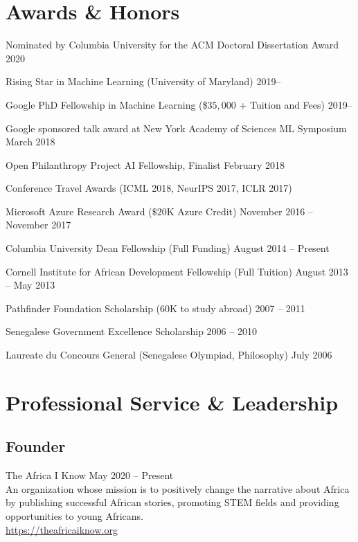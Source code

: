 \documentclass[letterpaper,200pt]{article}
\renewenvironment{itemize}{
  \begin{list}{}{
    \setlength{\leftmargin}{1.5em}
  }
}{
  \end{list}
}
\begin{document}
\section*{Awards \& Honors}
\begin{itemize}	
	\item Nominated by Columbia University for the ACM Doctoral Dissertation Award \hfill 2020
	\item Rising Star in Machine Learning (University of Maryland) \hfill {2019--}
	\item Google PhD Fellowship in Machine Learning (\$$35{,}000$ + Tuition and Fees) \hfill {2019--}
	\item Google sponsored talk award at New York Academy of Sciences ML Symposium \hfill March 2018
	\item Open Philanthropy Project AI Fellowship, Finalist \hfill February 2018
	\item Conference Travel Awards (ICML 2018, NeurIPS 2017, ICLR 2017)
	\item Microsoft Azure Research Award ($\$20$K Azure Credit) \hfill November 2016 -- November 2017
	\item Columbia University Dean Fellowship (Full Funding) \hfill August 2014 -- Present 
	\item Cornell Institute for African Development Fellowship (Full Tuition) \hfill August 2013 -- May 2013
	\item Pathfinder Foundation Scholarship (\EUR$60$K to study abroad) \hfill 2007 -- 2011
	\item Senegalese Government Excellence Scholarship \hfill 2006 -- 2010
	\item Laureate du Concours General (Senegalese Olympiad, Philosophy) \hfill July 2006
\end{itemize}

\section*{Professional Service \& Leadership}

\subsection*{Founder}
\begin{itemize}
	\item The Africa I Know\textsuperscript{\textregistered} \hfill May 2020 -- Present\\
	An organization whose mission is to positively change the narrative about Africa by publishing successful African stories, 
	promoting STEM fields and providing opportunities to young Africans.\\
	\url{https://theafricaiknow.org}
\end{itemize}
\end{document}
